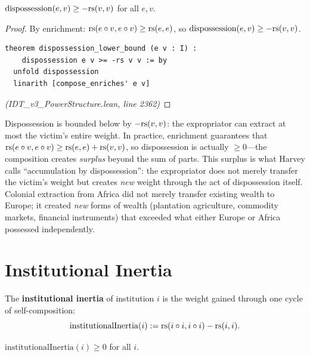 \begin{theorem}
\label{thm:dispossession-bound}
$\mathrm{dispossession}(e, v) \geq -\mathrm{rs}(v, v)$ for all $e, v$.
\end{theorem}

\begin{proof}
By enrichment: $\mathrm{rs}(e \circ v, e \circ v) \geq \mathrm{rs}(e,e)$, so
$\mathrm{dispossession}(e,v) \geq -\mathrm{rs}(v,v)$.
\begin{lstlisting}
theorem dispossession_lower_bound (e v : I) :
    dispossession e v >= -rs v v := by
  unfold dispossession
  linarith [compose_enriches' e v]
\end{lstlisting}
\textit{(IDT\_v3\_PowerStructure.lean, line 2362)}
\end{proof}

\begin{interpretation}
Dispossession is bounded below by $-\mathrm{rs}(v,v)$: the expropriator can extract
at most the victim's entire weight. In practice, enrichment guarantees that
$\mathrm{rs}(e \circ v, e \circ v) \geq \mathrm{rs}(e,e) + \mathrm{rs}(v,v)$, so
dispossession is actually $\geq 0$---the composition creates \emph{surplus}
beyond the sum of parts. This surplus is what Harvey calls ``accumulation
by dispossession'': the expropriator does not merely transfer the victim's
weight but creates \emph{new} weight through the act of dispossession itself.
Colonial extraction from Africa did not merely transfer existing wealth to
Europe; it created \emph{new} forms of wealth (plantation agriculture,
commodity markets, financial instruments) that exceeded what either Europe
or Africa possessed independently.
\end{interpretation}

\section{Institutional Inertia}

\begin{definition}
\label{def:institutional-inertia}
The \textbf{institutional inertia} of institution $i$ is the weight gained
through one cycle of self-composition:
\[
  \mathrm{institutionalInertia}(i) := \mathrm{rs}(i \circ i, i \circ i) - \mathrm{rs}(i, i).
\]
\end{definition}

\begin{theorem}
\label{thm:inertia-nonneg}
$\mathrm{institutionalInertia}(i) \geq 0$ for all $i$.
\end{theorem}

